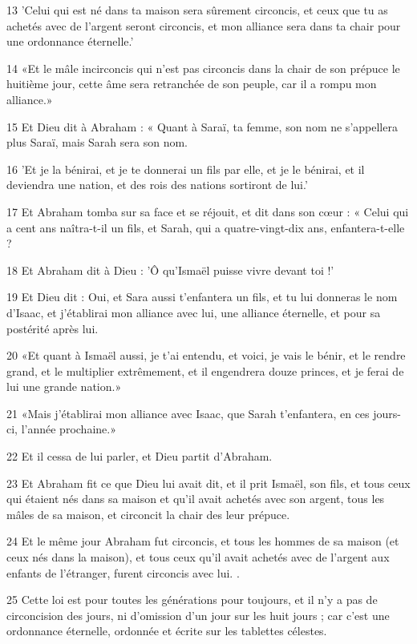 \par 13 'Celui qui est né dans ta maison sera sûrement circoncis, et ceux que tu as achetés avec de l'argent seront circoncis, et mon alliance sera dans ta chair pour une ordonnance éternelle.'
\par 14 «Et le mâle incirconcis qui n'est pas circoncis dans la chair de son prépuce le huitième jour, cette âme sera retranchée de son peuple, car il a rompu mon alliance.»
\par 15 Et Dieu dit à Abraham : « Quant à Saraï, ta femme, son nom ne s'appellera plus Saraï, mais Sarah sera son nom.
\par 16 'Et je la bénirai, et je te donnerai un fils par elle, et je le bénirai, et il deviendra une nation, et des rois des nations sortiront de lui.'
\par 17 Et Abraham tomba sur sa face et se réjouit, et dit dans son cœur : « Celui qui a cent ans naîtra-t-il un fils, et Sarah, qui a quatre-vingt-dix ans, enfantera-t-elle ?
\par 18 Et Abraham dit à Dieu : 'Ô qu'Ismaël puisse vivre devant toi !'
\par 19 Et Dieu dit : Oui, et Sara aussi t'enfantera un fils, et tu lui donneras le nom d'Isaac, et j'établirai mon alliance avec lui, une alliance éternelle, et pour sa postérité après lui.
\par 20 «Et quant à Ismaël aussi, je t'ai entendu, et voici, je vais le bénir, et le rendre grand, et le multiplier extrêmement, et il engendrera douze princes, et je ferai de lui une grande nation.»
\par 21 «Mais j'établirai mon alliance avec Isaac, que Sarah t'enfantera, en ces jours-ci, l'année prochaine.»
\par 22 Et il cessa de lui parler, et Dieu partit d'Abraham.
\par 23 Et Abraham fit ce que Dieu lui avait dit, et il prit Ismaël, son fils, et tous ceux qui étaient nés dans sa maison et qu'il avait achetés avec son argent, tous les mâles de sa maison, et circoncit la chair des leur prépuce.
\par 24 Et le même jour Abraham fut circoncis, et tous les hommes de sa maison (et ceux nés dans la maison), et tous ceux qu'il avait achetés avec de l'argent aux enfants de l'étranger, furent circoncis avec lui. .
\par 25 Cette loi est pour toutes les générations pour toujours, et il n'y a pas de circoncision des jours, ni d'omission d'un jour sur les huit jours ; car c'est une ordonnance éternelle, ordonnée et écrite sur les tablettes célestes.
